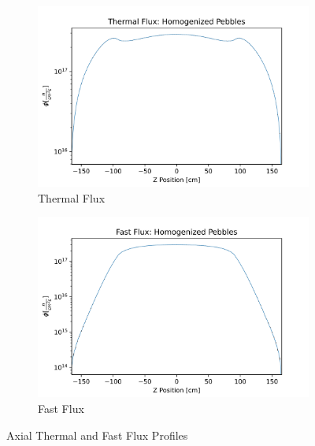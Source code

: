 \begin{figure}[h!]
\centering

\begin{subfigure}{0.6\textwidth}
  \includegraphics[width=0.95\linewidth]{figures/therm_flux_homog_z.png}
  \caption{Thermal Flux}
  \label{fig:hom-det-z-therm}
\end{subfigure}%
%
\begin{subfigure}{0.6\textwidth}
  \includegraphics[width=0.95\linewidth]{figures/fast_flux_homog_z.png}
  \caption{Fast Flux}
  \label{fig:hom-det-z-fast}
\end{subfigure}

%
\caption{Axial Thermal and Fast Flux Profiles}
\label{fig:hom-det-z}
\end{figure}